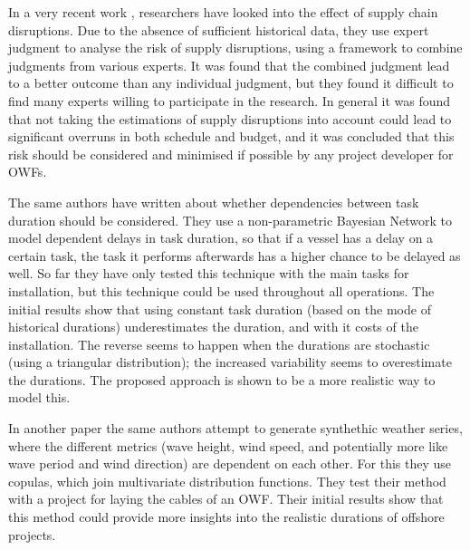 \documentclass[a4paper,12pt]{article}
\begin{document}
\bigskip

In a very recent work \cite{leontaris2019decision}, researchers have looked into the effect of supply chain disruptions. Due to the absence of sufficient historical data, they use expert judgment to analyse the risk of supply disruptions, using a framework to combine judgments from various experts. It was found that the combined judgment lead to a better outcome than any individual judgment, but they found it difficult to find many experts willing to participate in the research. In general it was found that not taking the estimations of supply disruptions into account could lead to significant overruns in both schedule and budget, and it was concluded that this risk should be considered and minimised if possible by any project developer for OWFs. 

The same authors have written about whether dependencies between task duration \cite{leontaris2018probabilistic} should be considered. They use a non-parametric Bayesian Network to model dependent delays in task duration, so that if a vessel has a delay on a certain task, the task it performs afterwards has a higher chance to be delayed as well. So far they have only tested this technique with the main tasks for installation, but this technique could be used throughout all operations. The initial results show that using constant task duration (based on the mode of historical durations) underestimates the duration, and with it costs of the installation. The reverse seems to happen when the durations are stochastic (using a triangular distribution); the increased variability seems to overestimate the durations. The proposed approach is shown to be a more realistic way to model this. 

In another paper \cite{leontaris2016probabilistic} the same authors attempt to generate synthethic weather series, where the different metrics (wave height, wind speed, and potentially more like wave period and wind direction) are dependent on each other. For this they use copulas, which join multivariate distribution functions. They test their method with a project for laying the cables of an OWF. Their initial results show that this method could provide more insights into the realistic durations of offshore projects. 

\bigskip
\end{document}
